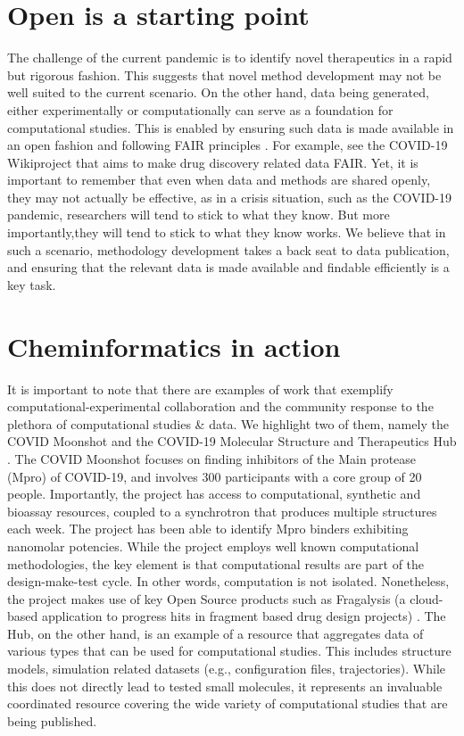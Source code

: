 \documentclass{bmcart}
\begin{document}
\section*{Open is a starting point}

The challenge of the current pandemic is to identify novel
therapeutics in a rapid but rigorous fashion. This suggests that novel
method development may not be well suited to the current scenario. On
the other hand, data being generated, either experimentally or
computationally can serve as a foundation for computational
studies. This is enabled by ensuring such data is made available in an
open fashion and following FAIR principles \cite{fair-1, fair-2}. For
example, see the COVID-19 Wikiproject \cite{wikidata} that aims to
make drug discovery related data FAIR. Yet, it is important to
remember that even when data and methods are shared openly, they may
not actually be effective, as in a crisis situation, such as the
COVID-19 pandemic, researchers will tend to stick to what they know.
But more importantly,they will tend to stick to what they know
works. We believe that in such a scenario, methodology development
takes a back seat to data publication, and ensuring that the relevant
data is made available and findable efficiently is a key task.

\section*{Cheminformatics in action}
\label{sec:chem-acti}

It is important to note that there are examples of work that exemplify
computational-experimental collaboration and the community response to
the plethora of computational studies \& data. We highlight two of
them, namely the COVID Moonshot \cite{moonshot} and the COVID-19
Molecular Structure and Therapeutics Hub \cite{molssi}. The COVID
Moonshot focuses on finding inhibitors of the Main protease (Mpro) of
COVID-19, and involves 300 participants with a core group of 20
people. Importantly, the project has access to computational,
synthetic and bioassay resources, coupled to a synchrotron that
produces multiple structures each week. The project has been able to
identify Mpro binders exhibiting nanomolar potencies. While the
project employs well known computational methodologies, the key
element is that computational results are part of the design-make-test
cycle. In other words, computation is not isolated. Nonetheless, the
project makes use of key Open Source products such as Fragalysis (a
cloud-based application to progress hits in fragment based drug design
projects) \cite{fragalysis}. The Hub, on the other hand, is an example
of a resource that aggregates data of various types that can be used
for computational studies. This includes structure models, simulation
related datasets (e.g., configuration files, trajectories). While this
does not directly lead to tested small molecules, it represents an
invaluable coordinated resource covering the wide variety of
computational studies that are being published.
\end{document}
